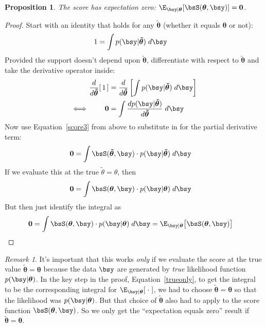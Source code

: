 \documentclass[12pt]{article}
\theoremstyle{plain}
\newtheorem{prop}[thm]{Proposition}
\theoremstyle{definition}
\theoremstyle{remark}
\newtheorem*{rmk}{Remark}
\newcommand{\bstheta}{\boldsymbol{\theta}}
\newcommand{\bstildetheta}{\boldsymbol{\tilde{\theta}}}
\renewcommand{\bso}{\boldsymbol{0}}
\begin{document}
\begin{prop}
The score has expectation zero:
$\E_{\bsy|\bstheta}[\bsS(\bstheta,\bsy)]=\bso$.
\end{prop}
\begin{proof}
Start with an identity that holds for any $\bstildetheta$ (whether it
equals $\bstheta$ or not):
\begin{align*}
  1 &= \int p(\bsy|\bstildetheta) \; d\bsy
\end{align*}
Provided the support doesn't depend upon $\bstildetheta$, differentiate
with respect to $\bstildetheta$ and take the derivative operator inside:
\begin{align*}
  \frac{d}{d\bstildetheta}
  [\, 1 \,]
  &=
  \frac{d}{d\bstildetheta}
  \left[
    \int p(\bsy|\bstildetheta) \; d\bsy
  \right] \\
  \iff\qquad
  \bso
  &=
  \int \frac{dp(\bsy|\bstildetheta)}{d\bstildetheta}  \; d\bsy
\end{align*}
Now use Equation~\ref{score3} from above to substitute in for the
partial derivative term:
\begin{align}
  \bso &= \int \bsS(\bstildetheta,\bsy)\cdot p(\bsy|\bstildetheta)
  \; d\bsy
  \label{trueonly}
\end{align}
If we evaluate this at the true $\tilde{\theta}=\theta$, then
\begin{align*}
  \bso &= \int \bsS(\bstheta,\bsy)\cdot p(\bsy|\bstheta) \; d\bsy
\end{align*}
But then just identify the integral as
\begin{align*}
  \bso &= \int \bsS(\bstheta,\bsy)\cdot p(\bsy|\bstheta) \; d\bsy
  = \E_{\bsy|\bstheta}\big[\bsS(\bstheta,\bsy)\big]
\end{align*}
\end{proof}
\begin{rmk}
It's important that this works \emph{only} if we evaluate the score at
the true value $\bstildetheta=\bstheta$ because the data $\bsy$ are
generated by \emph{true} likelihood function $p(\bsy|\bstheta)$.
In the key step in the proof, Equation~\ref{trueonly}, to get the
integral to be the corresponding integral for
$\E_{\bsy|\bstheta}[\;\cdot\;]$, we had to choose
$\bstildetheta=\bstheta$ so that the likelihood was $p(\bsy|\bstheta)$.
But that choice of $\bstildetheta$ also had to apply to the score
function $\bsS(\bstheta,\bsy)$. So we only get the ``expectation equals
zero'' result if $\bstildetheta=\bstheta$.
\end{rmk}
\end{document}
